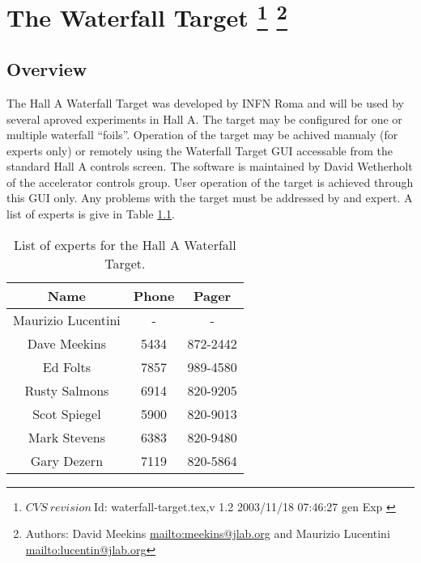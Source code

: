 \chapter[The Waterfall Target]{The Waterfall Target
\footnote{
  $CVS~revision~ $Id: waterfall-target.tex,v 1.2 2003/11/18 07:46:27 gen Exp $ $
}
\footnote{Authors: David Meekins \url{mailto:meekins@jlab.org} and 
 Maurizio Lucentini \url{mailto:lucentin@jlab.org}}
}

\section{Overview}

The Hall A Waterfall Target was developed by INFN Roma and will be
used by several aproved experiments in Hall A. The target may be configured
for one or multiple waterfall {}``foils''. Operation of the target
may be achived manualy (for experts only) or remotely using the Waterfall
Target GUI accessable from the standard Hall A controls screen. The
software is maintained by David Wetherholt of the accelerator controls
group. User operation of the target is achieved through this GUI only.
Any problems with the target must be addressed by and expert. A list
of experts is give in Table \ref{tab: experts}.%
\begin{table}
\begin{center}\begin{tabular}{|c|c|c|}
\hline 
Name &
Phone&
Pager\\
\hline
\hline 
Maurizio Lucentini&
-&
-\\
\hline
Dave Meekins&
5434&
872-2442\\
\hline
Ed Folts&
7857&
989-4580\\
\hline
Rusty Salmons&
6914&
820-9205\\
\hline
Scot Spiegel&
5900&
820-9013\\
\hline
Mark Stevens&
6383&
820-9480\\
\hline
Gary Dezern&
7119&
820-5864\\
\hline
\end{tabular}\end{center}


\caption{List of experts for the Hall A Waterfall Target.\label{tab: experts}}
\end{table}


